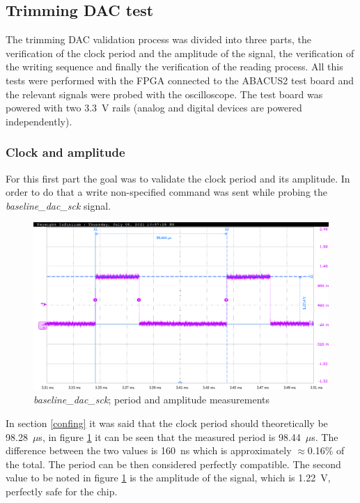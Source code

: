 \subsection{Trimming DAC test}\label{dactests}
The trimming DAC validation process was divided into three parts, the verification of the clock period and the amplitude of the signal, the verification of the writing sequence and finally the verification of the reading process. 
All this tests were performed with the FPGA connected to the ABACUS2 test board and the relevant signals were probed with the oscilloscope. The test board was powered with two 3.3~V rails (analog and digital devices are powered independently).
\subsubsection{Clock and amplitude}
For this first part the goal was to validate the clock period and its amplitude. In order to do that a write non-specified command was sent while probing the \textit{baseline\_dac\_sck} signal. 
\begin{figure}[H]
	\centering
	\includegraphics[width=0.7\linewidth]{IMG/ch5/probe/09-08-2021_clock-specks}
	\caption{\textit{baseline\_dac\_sck}; period and amplitude measurements}
	\label{fig:clockspecs}
\end{figure}
\noindent In section \ref{confing} it was said that the clock period should theoretically be 98.28~$\mu$s, in figure \ref{fig:clockspecs} it can be seen that the measured period is 98.44~$\mu$s. The difference between the two values is 160~ns which is approximately $\approx$0.16\% of the total. The period can be then considered perfectly compatible.
The second value to be noted in figure \ref{fig:clockspecs} is the amplitude of the signal, which is 1.22~V, perfectly safe for the chip. 

